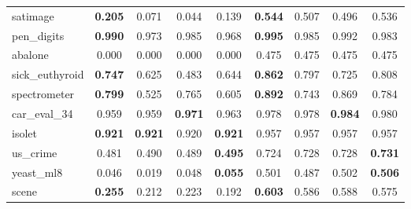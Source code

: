 \begin{figure}[ht]
\begin{tabular}{p{22mm}|*4{p{14mm}}|*4{p{14mm}}}
        satimage&\multicolumn{1}{c}{\textbf{0.205}}&\multicolumn{1}{c}{0.071}&\multicolumn{1}{c}{0.044}&\multicolumn{1}{c|}{0.139}&\multicolumn{1}{c}{\textbf{0.544}}&\multicolumn{1}{c}{0.507}&\multicolumn{1}{c}{0.496}&\multicolumn{1}{c}{0.536}\\
        pen\_digits&\multicolumn{1}{c}{\textbf{0.990}}&\multicolumn{1}{c}{0.973}&\multicolumn{1}{c}{0.985}&\multicolumn{1}{c|}{0.968}&\multicolumn{1}{c}{\textbf{0.995}}&\multicolumn{1}{c}{0.985}&\multicolumn{1}{c}{0.992}&\multicolumn{1}{c}{0.983}\\
        abalone&\multicolumn{1}{c}{0.000}&\multicolumn{1}{c}{0.000}&\multicolumn{1}{c}{0.000}&\multicolumn{1}{c|}{0.000}&\multicolumn{1}{c}{0.475}&\multicolumn{1}{c}{0.475}&\multicolumn{1}{c}{0.475}&\multicolumn{1}{c}{0.475}\\
        sick\_euthyroid&\multicolumn{1}{c}{\textbf{0.747}}&\multicolumn{1}{c}{0.625}&\multicolumn{1}{c}{0.483}&\multicolumn{1}{c|}{0.644}&\multicolumn{1}{c}{\textbf{0.862}}&\multicolumn{1}{c}{0.797}&\multicolumn{1}{c}{0.725}&\multicolumn{1}{c}{0.808}\\
        spectrometer&\multicolumn{1}{c}{\textbf{0.799}}&\multicolumn{1}{c}{0.525}&\multicolumn{1}{c}{0.765}&\multicolumn{1}{c|}{0.605}&\multicolumn{1}{c}{\textbf{0.892}}&\multicolumn{1}{c}{0.743}&\multicolumn{1}{c}{0.869}&\multicolumn{1}{c}{0.784}\\
        car\_eval\_34&\multicolumn{1}{c}{0.959}&\multicolumn{1}{c}{0.959}&\multicolumn{1}{c}{\textbf{0.971}}&\multicolumn{1}{c|}{0.963}&\multicolumn{1}{c}{0.978}&\multicolumn{1}{c}{0.978}&\multicolumn{1}{c}{\textbf{0.984}}&\multicolumn{1}{c}{0.980}\\
        isolet&\multicolumn{1}{c}{\textbf{0.921}}&\multicolumn{1}{c}{\textbf{0.921}}&\multicolumn{1}{c}{0.920}&\multicolumn{1}{c|}{\textbf{0.921}}&\multicolumn{1}{c}{0.957}&\multicolumn{1}{c}{0.957}&\multicolumn{1}{c}{0.957}&\multicolumn{1}{c}{0.957}\\
        us\_crime&\multicolumn{1}{c}{0.481}&\multicolumn{1}{c}{0.490}&\multicolumn{1}{c}{0.489}&\multicolumn{1}{c|}{\textbf{0.495}}&\multicolumn{1}{c}{0.724}&\multicolumn{1}{c}{0.728}&\multicolumn{1}{c}{0.728}&\multicolumn{1}{c}{\textbf{0.731}}\\
        yeast\_ml8&\multicolumn{1}{c}{0.046}&\multicolumn{1}{c}{0.019}&\multicolumn{1}{c}{0.048}&\multicolumn{1}{c|}{\textbf{0.055}}&\multicolumn{1}{c}{0.501}&\multicolumn{1}{c}{0.487}&\multicolumn{1}{c}{0.502}&\multicolumn{1}{c}{\textbf{0.506}}\\
        scene&\multicolumn{1}{c}{\textbf{0.255}}&\multicolumn{1}{c}{0.212}&\multicolumn{1}{c}{0.223}&\multicolumn{1}{c|}{0.192}&\multicolumn{1}{c}{\textbf{0.603}}&\multicolumn{1}{c}{0.586}&\multicolumn{1}{c}{0.588}&\multicolumn{1}{c}{0.575}\\

\end{tabular}
\end{figure}
